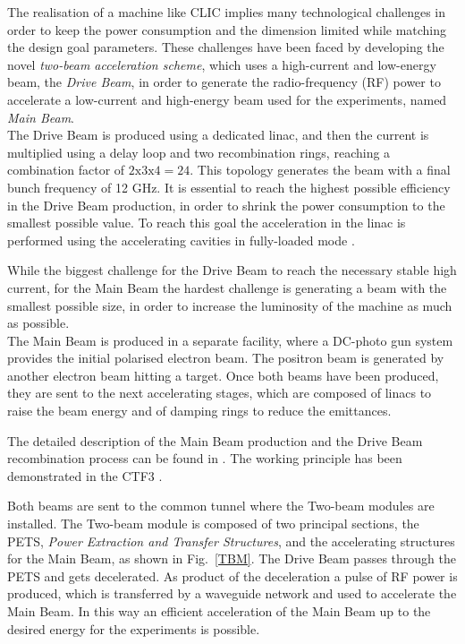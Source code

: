 The realisation of a machine like CLIC implies many technological challenges in order to keep the power consumption and the dimension limited while matching the design goal parameters. These challenges have been faced by developing the novel \textit{two-beam acceleration scheme}, which uses a high-current and low-energy beam, the \textit{Drive Beam}, in order to generate the radio-frequency (RF) power to accelerate a low-current and high-energy beam used for the experiments, named \textit{Main Beam}. \\
The Drive Beam is produced using a dedicated linac, and then the current is multiplied using a delay loop and two recombination rings, reaching a combination factor of $2\text{x}3\text{x}4=24$. This topology generates the beam with a final bunch frequency of 12 GHz. It is essential to reach the highest possible efficiency in the Drive Beam production, in order to shrink the power consumption to the smallest possible value. To reach this goal the acceleration in the linac is performed using the accelerating cavities in fully-loaded mode \cite{Corsini:791372}.

While the biggest challenge for the Drive Beam to reach the necessary stable high current, for the Main Beam the hardest challenge is generating a beam with the smallest possible size, in order to increase the luminosity of the machine as much as possible.\\
The Main Beam is produced in a separate facility, where a DC-photo gun system provides the initial polarised electron beam. The positron beam is generated by another electron beam hitting a target. Once both beams have been produced, they are sent to the next accelerating stages, which are composed of linacs to raise the beam energy and of damping rings to reduce the emittances. 

The detailed description of the Main Beam production and the Drive Beam recombination process can be found in \cite{CLIC:cdr}. The working principle has been demonstrated in the CTF3 \cite{CTF:drive_beam}. 

Both beams are sent to the common tunnel where the Two-beam modules are installed. The Two-beam module is composed of two principal sections, the PETS, \textit{Power Extraction and Transfer Structures}, and the accelerating structures for the Main Beam, as shown in Fig.~\ref{TBM}. The Drive Beam passes through the PETS and gets decelerated. As product of the deceleration a pulse of RF power is produced, which is transferred by a waveguide network and used to accelerate the Main Beam. In this way  an efficient acceleration of the Main Beam up to the desired energy for the experiments is possible.

